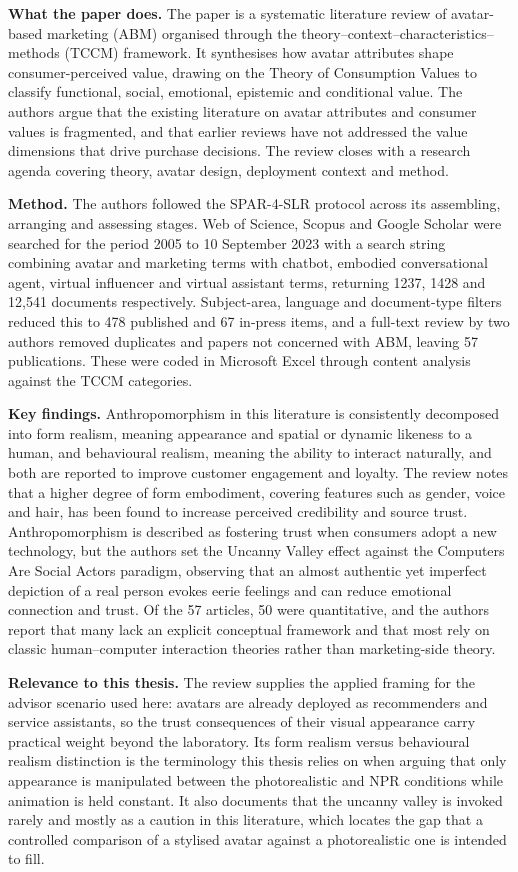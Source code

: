 \documentclass[11pt, a4paper]{article}
\begin{document}
\textbf{What the paper does.} The paper is a systematic literature review of avatar-based marketing (ABM) organised through the theory--context--characteristics--methods (TCCM) framework. It synthesises how avatar attributes shape consumer-perceived value, drawing on the Theory of Consumption Values to classify functional, social, emotional, epistemic and conditional value. The authors argue that the existing literature on avatar attributes and consumer values is fragmented, and that earlier reviews have not addressed the value dimensions that drive purchase decisions. The review closes with a research agenda covering theory, avatar design, deployment context and method.

\textbf{Method.} The authors followed the SPAR-4-SLR protocol across its assembling, arranging and assessing stages. Web of Science, Scopus and Google Scholar were searched for the period 2005 to 10 September 2023 with a search string combining avatar and marketing terms with chatbot, embodied conversational agent, virtual influencer and virtual assistant terms, returning 1237, 1428 and 12{,}541 documents respectively. Subject-area, language and document-type filters reduced this to 478 published and 67 in-press items, and a full-text review by two authors removed duplicates and papers not concerned with ABM, leaving 57 publications. These were coded in Microsoft Excel through content analysis against the TCCM categories.

\textbf{Key findings.} Anthropomorphism in this literature is consistently decomposed into form realism, meaning appearance and spatial or dynamic likeness to a human, and behavioural realism, meaning the ability to interact naturally, and both are reported to improve customer engagement and loyalty. The review notes that a higher degree of form embodiment, covering features such as gender, voice and hair, has been found to increase perceived credibility and source trust. Anthropomorphism is described as fostering trust when consumers adopt a new technology, but the authors set the Uncanny Valley effect against the Computers Are Social Actors paradigm, observing that an almost authentic yet imperfect depiction of a real person evokes eerie feelings and can reduce emotional connection and trust. Of the 57 articles, 50 were quantitative, and the authors report that many lack an explicit conceptual framework and that most rely on classic human--computer interaction theories rather than marketing-side theory.

\textbf{Relevance to this thesis.} The review supplies the applied framing for the advisor scenario used here: avatars are already deployed as recommenders and service assistants, so the trust consequences of their visual appearance carry practical weight beyond the laboratory. Its form realism versus behavioural realism distinction is the terminology this thesis relies on when arguing that only appearance is manipulated between the photorealistic and NPR conditions while animation is held constant. It also documents that the uncanny valley is invoked rarely and mostly as a caution in this literature, which locates the gap that a controlled comparison of a stylised avatar against a photorealistic one is intended to fill.
\end{document}
